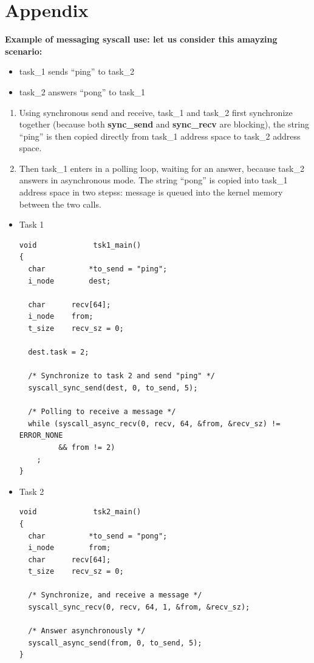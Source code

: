%
%

\newpage

\section{Appendix}

\textbf{Example of messaging syscall use: let us consider this amayzing scenario:}
\begin{itemize}
  \item task\_1 sends ``ping'' to task\_2
  \item task\_2 answers ``pong'' to task\_1
\end{itemize}


\begin{enumerate}
  \item Using synchronous send and receive, task\_1 and task\_2 first
    synchronize together (because both \textbf{sync\_send} and
    \textbf{sync\_recv} are blocking), the string ``ping'' is then copied
    directly from task\_1 address space to task\_2 address space.

  \item	Then task\_1 enters in a polling loop, waiting for an answer, because
    task\_2 answers in asynchronous mode. The string ``pong'' is copied into
    task\_1 address space in two stepss: message is queued into the kernel
    memory between the two calls.
\end{enumerate}

\begin{itemize}
  \item Task 1
\begin{verbatim}
void             tsk1_main()
{
  char          *to_send = "ping";
  i_node        dest;

  char		recv[64];
  i_node	from;
  t_size	recv_sz = 0;

  dest.task = 2;

  /* Synchronize to task 2 and send "ping" */
  syscall_sync_send(dest, 0, to_send, 5);

  /* Polling to receive a message */
  while (syscall_async_recv(0, recv, 64, &from, &recv_sz) != ERROR_NONE
         && from != 2)
    ;
}
\end{verbatim}

  \item Task 2
\begin{verbatim}
void             tsk2_main()
{
  char          *to_send = "pong";
  i_node        from;
  char		recv[64];
  t_size	recv_sz = 0;

  /* Synchronize, and receive a message */
  syscall_sync_recv(0, recv, 64, 1, &from, &recv_sz);

  /* Answer asynchronously */
  syscall_async_send(from, 0, to_send, 5);
}
\end{verbatim}

\end{itemize}

